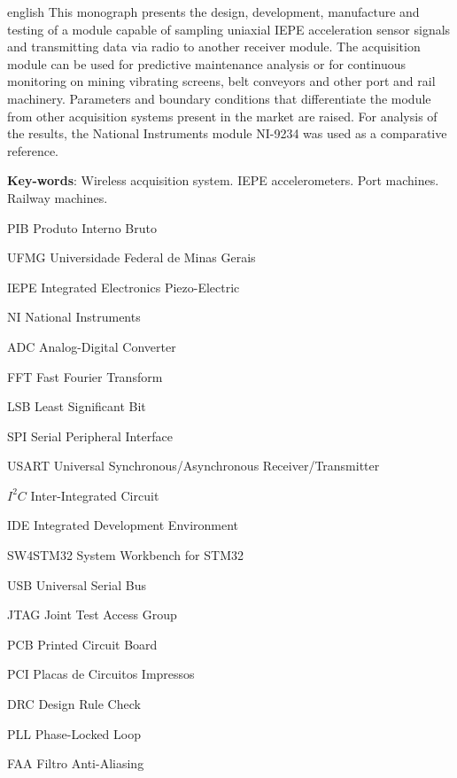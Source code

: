 \documentclass[
	12pt,				%
	openright,			%
	twoside,			%
	a4paper,			%
	english,			%
	french,				%
	spanish,			%
	brazil,				%
	]{abntex2}
\begin{document}
\begin{resumo}[Abstract]
	\begin{otherlanguage*}{english}
		This monograph presents the design, development, manufacture and testing of a module capable of sampling uniaxial IEPE acceleration sensor signals and transmitting data via radio to another receiver module. The acquisition module can be used for predictive maintenance analysis or for continuous monitoring on mining vibrating screens, belt conveyors and other port and rail machinery. Parameters and boundary conditions that differentiate the module from other acquisition systems present in the market are raised. For analysis of the results, the National Instruments module NI-9234 was used as a comparative reference.

		\vspace{\onelineskip}
		
		\noindent 
		\textbf{Key-words}: Wireless acquisition system. IEPE accelerometers. Port machines. Railway machines.
	\end{otherlanguage*}
\end{resumo}

\listoffigures*
\cleardoublepage


\begin{siglas}
	\item[PIB] Produto Interno Bruto
	\item[UFMG] Universidade Federal de Minas Gerais
	\item[IEPE] Integrated Electronics Piezo-Electric
	\item[NI] National Instruments
	\item[ADC] Analog-Digital Converter
	\item[FFT] Fast Fourier Transform
	\item[LSB] Least Significant Bit
	\item[SPI] Serial Peripheral Interface
	\item[USART] Universal Synchronous/Asynchronous Receiver/Transmitter
	\item[$I^2C$] Inter-Integrated Circuit
	\item[IDE] Integrated Development Environment
	\item[SW4STM32] System Workbench for STM32
	\item[USB] Universal Serial Bus
	\item[JTAG] Joint Test Access Group
	\item[PCB] Printed Circuit Board
	\item[PCI] Placas de Circuitos Impressos
	\item[DRC] Design Rule Check
	\item[PLL] Phase-Locked Loop
	\item[FAA] Filtro Anti-Aliasing
\end{siglas}
\end{document}

